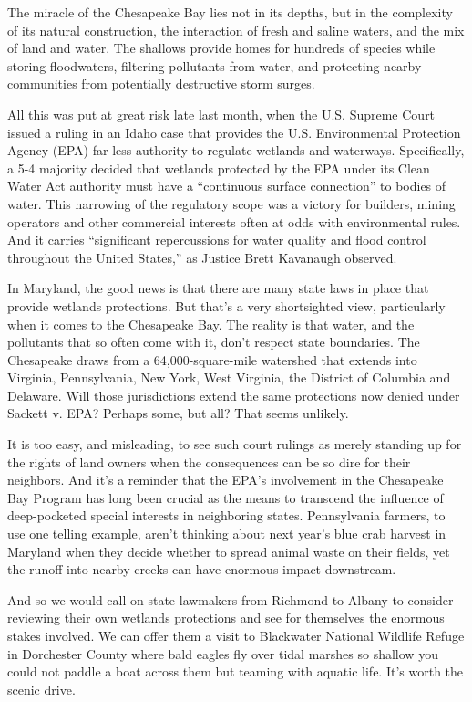 \documentclass[UTF8,11pt]{ctexart}
\begin{document}
The miracle of the Chesapeake Bay lies not in its depths, but in the complexity of its natural construction, the interaction of fresh and saline waters, and the mix of land and water. The shallows provide homes for hundreds of species while storing floodwaters, filtering pollutants from water, and protecting nearby communities from potentially destructive storm surges.


All this was put at great risk late last month, when the U.S. Supreme Court issued a ruling in an Idaho case that provides the U.S. Environmental Protection Agency (EPA) far less authority to regulate wetlands and waterways. Specifically, a 5-4 majority decided that wetlands protected by the EPA under its Clean Water Act authority must have a “continuous surface connection” to bodies of water. This narrowing of the regulatory scope was a victory for builders, mining operators and other commercial interests often at odds with environmental rules. And it carries “significant repercussions for water quality and flood control throughout the United States,” as Justice Brett Kavanaugh observed.


In Maryland, the good news is that there are many state laws in place that provide wetlands protections. But that’s a very shortsighted view, particularly when it comes to the Chesapeake Bay. The reality is that water, and the pollutants that so often come with it, don’t respect state boundaries. The Chesapeake draws from a 64,000-square-mile watershed that extends into Virginia, Pennsylvania, New York, West Virginia, the District of Columbia and Delaware. Will those jurisdictions extend the same protections now denied under Sackett v. EPA? Perhaps some, but all? That seems unlikely.


It is too easy, and misleading, to see such court rulings as merely standing up for the rights of land owners when the consequences can be so dire for their neighbors. And it’s a reminder that the EPA’s involvement in the Chesapeake Bay Program has long been crucial as the means to transcend the influence of deep-pocketed special interests in neighboring states. Pennsylvania farmers, to use one telling example, aren’t thinking about next year’s blue crab harvest in Maryland when they decide whether to spread animal waste on their fields, yet the runoff into nearby creeks can have enormous impact downstream.


And so we would call on state lawmakers from Richmond to Albany to consider reviewing their own wetlands protections and see for themselves the enormous stakes involved. We can offer them a visit to Blackwater National Wildlife Refuge in Dorchester County where bald eagles fly over tidal marshes so shallow you could not paddle a boat across them but teaming with aquatic life. It’s worth the scenic drive.
\end{document}
